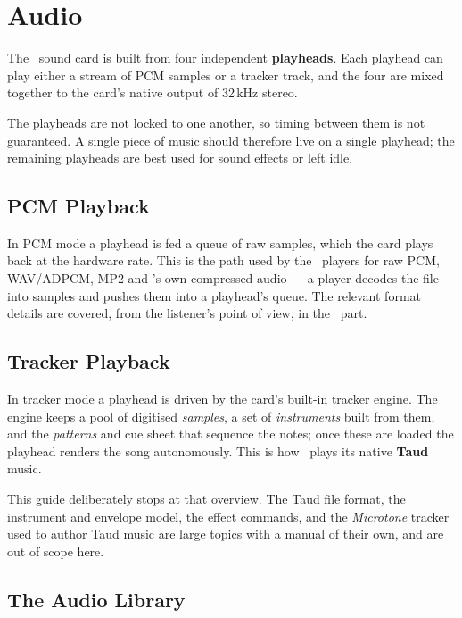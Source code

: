 \chapter{Audio}

The \thismachine\ sound card is built from four independent \textbf{playheads}. Each playhead can play either a stream of PCM samples or a tracker track, and the four are mixed together to the card's native output of 32\,kHz stereo.

The playheads are not locked to one another, so timing between them is not guaranteed. A single piece of music should therefore live on a single playhead; the remaining playheads are best used for sound effects or left idle.

\section{PCM Playback}

In PCM mode a playhead is fed a queue of raw samples, which the card plays back at the hardware rate. This is the path used by the \thedos\ players for raw PCM, WAV/ADPCM, MP2 and \thedos's own compressed audio --- a player decodes the file into samples and pushes them into a playhead's queue. The relevant format details are covered, from the listener's point of view, in the \thedos\ part.

\section{Tracker Playback}

In tracker mode a playhead is driven by the card's built-in tracker engine. The engine keeps a pool of digitised \emph{samples}, a set of \emph{instruments} built from them, and the \emph{patterns} and cue sheet that sequence the notes; once these are loaded the playhead renders the song autonomously. This is how \thismachine\ plays its native \textbf{Taud} music.

This guide deliberately stops at that overview. The Taud file format, the instrument and envelope model, the effect commands, and the \emph{Microtone} tracker used to author Taud music are large topics with a manual of their own, and are out of scope here.

\section{The Audio Library}

